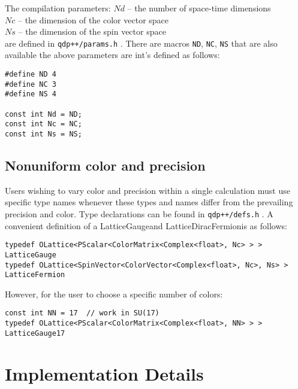 \documentclass[12pt,letterpaper]{article}
\newcommand{\tLatticeColorMatrix}{LatticeGauge}
\newcommand{\tLatticeDiracFermion}{LatticeDiracFermion}
\begin{document}
The compilation parameters:
\noindent
$Nd$ -- the number of space-time dimensions\\
\noindent
$Nc$ -- the dimension of the color vector space\\
\noindent
$Ns$ -- the dimension of the spin vector space\\
\noindent
are defined in {\tt qdp++/params.h} . There are macros {\tt ND}, {\tt NC},
{\tt NS} that are also available the above parameters are int's
defined as follows:
\begin{verbatim}
#define ND 4
#define NC 3
#define NS 4

const int Nd = ND;
const int Nc = NC;
const int Ns = NS;
\end{verbatim}

\subsection{Nonuniform color and precision}

Users wishing to vary color and precision within a single calculation
must use specific type names whenever these types
and names differ from the prevailing precision and color. 
Type declarations can be found in {\tt qdp++/defs.h} . A convenient
definition of a \tLatticeColorMatrix and \tLatticeDiracFermion is as follows:

\begin{verbatim}
typedef OLattice<PScalar<ColorMatrix<Complex<float>, Nc> > > LatticeGauge
typedef OLattice<SpinVector<ColorVector<Complex<float>, Nc>, Ns> > LatticeFermion
\end{verbatim}

However, for the user to choose a specific number of colors:

\begin{verbatim}
const int NN = 17  // work in SU(17)
typedef OLattice<PScalar<ColorMatrix<Complex<float>, NN> > > LatticeGauge17
\end{verbatim}

\section{Implementation Details}
\label{sec:implementation}
\end{document}
